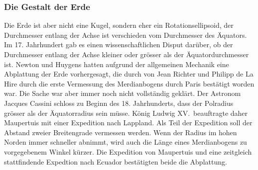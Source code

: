 %
%
\subsubsection{Die Gestalt der Erde}
Die Erde ist aber nicht eine Kugel, sondern eher ein Rotationsellipsoid,
der Durchmesser entlang der Achse ist verschieden vom Durchmesser des 
Äquators.
%
Im 17. Jahrhundert gab es einen wissenschaftlichen Disput darüber,
ob der Durchmesser entlang der Achse kleiner oder grösser als der
Äquatordurchmesser ist.
Newton und Huygens hatten aufgrund der allgemeinen Mechanik eine Abplattung
der Erde vorhergesagt, die durch von Jean Richter und Philipp de La Hire
%
%
durch die erste Vermessung des Merdianbogens durch Paris bestätigt 
worden war.
Die Sache war aber immer noch nicht vollständig geklärt.
Der Astronom Jacques Cassini schloss zu Beginn des 18. Jahrhunderts,
%
dass der Polradius grösser als der Äquatorradius sein müsse.
König Ludwig XV.~beauftragte daher Maupertuis mit einer Expedition
%
%
nach Lappland.
%
Als Teil der Expedition soll der Abstand zweier Breitengrade
vermessen werden.
Wenn der Radius im hohen Norden immer schneller abnimmt, wird auch die Länge
eines Merdianbogens zu vorgegebenem Winkel kürzer.
Die Expedition von Maupertuis und eine zeitgleich stattfindende Expedtion
nach Ecuador bestätigten beide die Abplattung.
%




